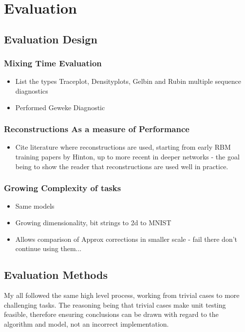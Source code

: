 \chapter{Evaluation}

\section{Evaluation Design}


\subsection{Mixing Time Evaluation}
  \begin{itemize}
    \item List the types Traceplot, Densityplots, Gelbin and Rubin multiple sequence diagnostics
    \item Performed Geweke Diagnostic
  \end{itemize}
\subsection{Reconstructions As a measure of Performance}

 \begin{itemize}
   \item Cite literature where reconstructions are used, starting from early RBM training papers by Hinton, up to more recent in deeper networks - the goal being to show the reader that reconstructions are used well in practice.
 \end{itemize}

 \subsection{Growing Complexity of tasks}

 \begin{itemize}
   \item Same models
   \item Growing dimensionality, bit strings to 2d to MNIST
   \item Allows comparison of Approx corrections in smaller scale - fail there don't continue using them...
 \end{itemize}

\section{Evaluation Methods}

My  all followed the same high level process, working from trivial cases to more challenging tasks. The reasoning being that trivial cases make unit testing feasible, therefore ensuring conclusions can be drawn with regard to the algorithm and model, not an incorrect implementation.

